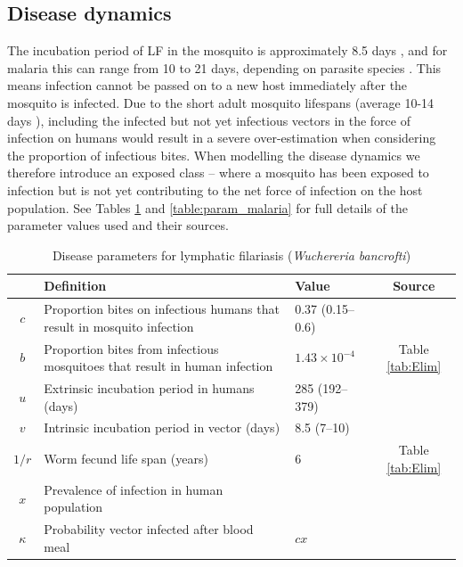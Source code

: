 \subsection{Disease dynamics}

The incubation period of LF in the mosquito is approximately 8.5 days \cite{le2007,erickson2009}, and for malaria this can range from 10 to 21 days, depending on parasite species \cite{CDCMalaria}. This means infection cannot be passed on to a new host immediately after the mosquito is infected. Due to the short adult mosquito lifespans (average 10-14 days \cite{le2007}), including the infected but not yet infectious vectors in the force of infection on humans would result in a severe over-estimation when considering the proportion of infectious bites. When modelling the disease dynamics we therefore introduce an exposed class -- where a mosquito has been exposed to infection but is not yet contributing to the net force of infection on the host population. See Tables \ref{table:param_LF} and \ref{table:param_malaria} for full details of the parameter values used and their sources.

\begin{table}[t]
\caption{Disease parameters for lymphatic filariasis (\textit{Wuchereria bancrofti})}%
\vspace{.1cm}
\centering %
\begin{tabular}{|c|p{65mm}|p{35mm}|c|}%
\hline                        %
 & Definition & Value & Source \\ [0.5ex]%
\hline                  %
$c$ & Proportion bites on infectious humans that result in mosquito infection & 0.37 (0.15--0.6) & \cite{gambhir2008,Subramanian1998}\\
$b$ & Proportion bites from infectious mosquitoes that result in human infection & $1.43\times 10^{-4}$ & Table \ref{tab:Elim} \\
$u$ & Extrinsic incubation period in humans (days) & 285 (192--379)& \cite{Addiss2000} \\
$v$ & Intrinsic incubation period in vector (days) & 8.5 (7--10) & \cite{erickson2009} \\
$1/r$ & Worm fecund life span (years) & 6 & Table \ref{tab:Elim} \\
$x$ & Prevalence of infection in human population & & \\
$\kappa$ & Probability  vector infected after blood meal & $cx$ & \\
[1ex]      %
\hline%
\end{tabular}
\label{table:param_LF}%
\end{table}

